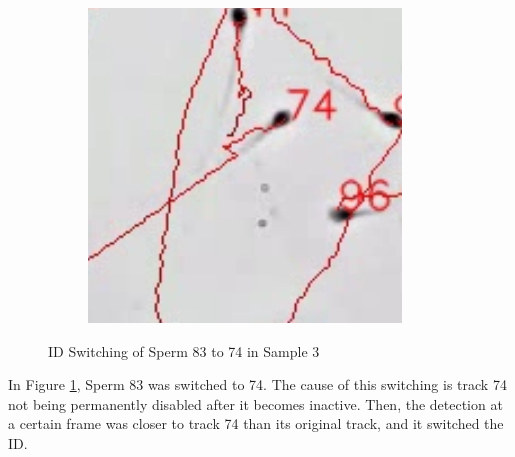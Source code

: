 \begin{figure}[ht]
\begin{subfigure}[b]{0.3\textwidth}
     \end{subfigure}
     \hfill
     \begin{subfigure}[b]{0.3\textwidth}
         \centering
         \includegraphics[width=\textwidth]{Images/sam333333.png}
     \end{subfigure}
        \caption{ID Switching of Sperm 83 to 74 in Sample 3}
        \label{sam3sw}
\end{figure}

In Figure \ref{sam3sw}, Sperm 83 was switched to 74. The cause of this switching is track 74 not being permanently disabled after it becomes inactive. Then, the detection at a certain frame was closer to track 74 than its original track, and it switched the ID.

